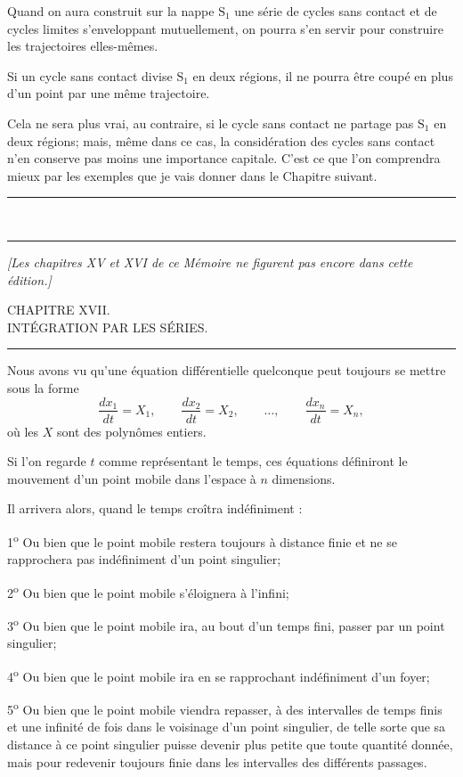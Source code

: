 \documentclass[11pt]{article}
\newcommand{\ornament}{\begin{center}\rule{2.5em}{0.4pt}\,\raisebox{0.1ex}{\tiny$\bullet\bullet\bullet$}\,\rule{2.5em}{0.4pt}\end{center}}
\newcommand{\shortline}{\begin{center}\rule{3.5em}{0.4pt}\end{center}}
\begin{document}
Quand on aura construit sur la nappe $\mathrm{S}_1$ une série de cycles sans contact et de cycles limites s’enveloppant mutuellement, on pourra s’en servir pour construire les trajectoires elles-mêmes.

Si un cycle sans contact divise $\mathrm{S}_1$ en deux régions, il ne pourra être coupé en plus d’un point par une même trajectoire.

Cela ne sera plus vrai, au contraire, si le cycle sans contact ne partage pas $\mathrm{S}_1$ en deux régions; mais, même dans ce cas, la considération des cycles sans contact n’en conserve pas moins une importance capitale. C’est ce que l’on comprendra mieux par les exemples que je vais donner dans le Chapitre suivant.

\ornament

\begin{center}\itshape [Les chapitres XV et XVI de ce Mémoire ne figurent pas encore dans cette édition.]\end{center}

\clearpage
\begin{center}
{\Large CHAPITRE XVII.}\\[0.6em]
{\large INTÉGRATION PAR LES SÉRIES.}
\end{center}
\shortline

Nous avons vu qu’une équation différentielle quelconque peut toujours se mettre sous la forme
\begin{equation}
\frac{dx_1}{dt}=X_1,\qquad \frac{dx_2}{dt}=X_2,\qquad \ldots,\qquad \frac{dx_n}{dt}=X_n,
\tag{1}
\end{equation}
où les $X$ sont des polynômes entiers.

Si l’on regarde $t$ comme représentant le temps, ces équations définiront le mouvement d’un point mobile dans l’espace à $n$ dimensions.

Il arrivera alors, quand le temps croîtra indéfiniment :

1\textsuperscript{o} Ou bien que le point mobile restera toujours à distance finie et ne se rapprochera pas indéfiniment d’un point singulier;

2\textsuperscript{o} Ou bien que le point mobile s’éloignera à l’infini;

3\textsuperscript{o} Ou bien que le point mobile ira, au bout d’un temps fini, passer par un point singulier;

4\textsuperscript{o} Ou bien que le point mobile ira en se rapprochant indéfiniment d’un foyer;

5\textsuperscript{o} Ou bien que le point mobile viendra repasser, à des intervalles de temps finis et une infinité de fois dans le voisinage d’un point singulier, de telle sorte que sa distance à ce point singulier puisse devenir plus petite que toute quantité donnée, mais pour redevenir toujours finie dans les intervalles des différents passages.
\end{document}
